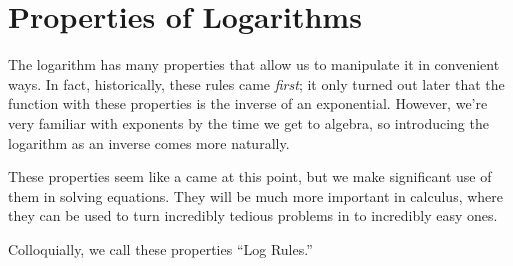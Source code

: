 \section{Properties of Logarithms}
The logarithm has many properties that allow us to manipulate it in convenient ways. In fact, historically, these rules came \emph{first}; it only turned out later that the function with these properties is the inverse of an exponential. However, we're very familiar with exponents by the time we get to algebra, so introducing the logarithm as an inverse comes more naturally.

These properties seem like a came at this point, but we make significant use of them in solving equations. They will be much more important in calculus, where they can be used to turn incredibly tedious problems in to incredibly easy ones.

Colloquially, we call these properties ``Log Rules.''

 
 
 
 
 
 
 
 
% 

